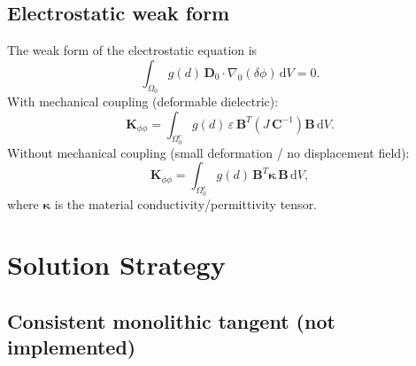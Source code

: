 \documentclass[11pt,a4paper]{article}
\newcommand{\CC}{\bm{C}}
\newcommand{\DD}{\bm{D}}
\newcommand{\Grad}{\nabla_{\!0}}
\newcommand{\diff}{\mathrm{d}}
\begin{document}
\subsection{Electrostatic weak form}

The weak form of the electrostatic equation is
\begin{equation}
    \int_{\Omega_0} g(d)\, \DD_0 \cdot \Grad(\delta\phi) \, \diff V = 0.
\end{equation}
With mechanical coupling (deformable dielectric):
\begin{equation}
    \bm{K}_{\phi\phi} = \int_{\Omega_0^e} g(d)\, \varepsilon\, \bm{B}^T \left(J\, \CC^{-1}\right) \bm{B} \, \diff V.
\end{equation}
Without mechanical coupling (small deformation / no displacement field):
\begin{equation}
    \bm{K}_{\phi\phi} = \int_{\Omega_0^e} g(d)\, \bm{B}^T \bm{\kappa} \, \bm{B} \, \diff V,
\end{equation}
where $\bm{\kappa}$ is the material conductivity/permittivity tensor.

\section{Solution Strategy}

\subsection{Consistent monolithic tangent (not implemented)}
\end{document}
